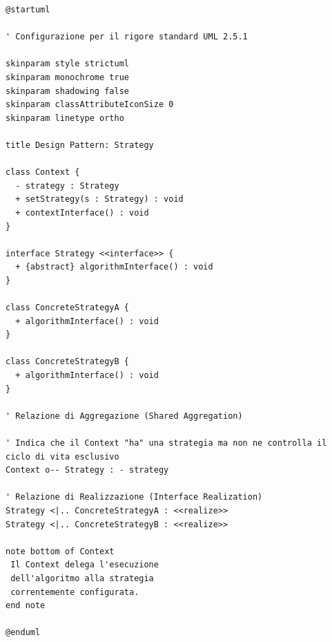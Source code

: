 \begin{verbatim}
@startuml

' Configurazione per il rigore standard UML 2.5.1

skinparam style strictuml
skinparam monochrome true
skinparam shadowing false
skinparam classAttributeIconSize 0
skinparam linetype ortho

title Design Pattern: Strategy

class Context {
  - strategy : Strategy
  + setStrategy(s : Strategy) : void
  + contextInterface() : void
}

interface Strategy <<interface>> {
  + {abstract} algorithmInterface() : void
}

class ConcreteStrategyA {
  + algorithmInterface() : void
}

class ConcreteStrategyB {
  + algorithmInterface() : void
}

' Relazione di Aggregazione (Shared Aggregation)

' Indica che il Context "ha" una strategia ma non ne controlla il ciclo di vita esclusivo
Context o-- Strategy : - strategy

' Relazione di Realizzazione (Interface Realization)
Strategy <|.. ConcreteStrategyA : <<realize>>
Strategy <|.. ConcreteStrategyB : <<realize>>

note bottom of Context
 Il Context delega l'esecuzione 
 dell'algoritmo alla strategia 
 correntemente configurata.
end note

@enduml

\end{verbatim}